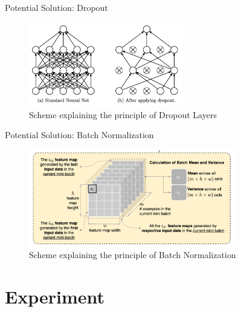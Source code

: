 \documentclass[aspectratio=169]{beamer}
\begin{document}
{    
    \begin{frame}{Potential Solution: Dropout}
        \begin{figure}
            \centering
            \includegraphics[width=0.6\textwidth]{img/dropout_schema.png}
            \caption{Scheme explaining the principle of Dropout Layers}
        \end{figure}
    \end{frame}


    \begin{frame}{Potential Solution: Batch Normalization}
        \begin{figure}
            \centering
            \includegraphics[width=0.8\textwidth]{img/BatchNorm_Schema.png}
            \caption{Scheme explaining the principle of Batch Normalization}
        \end{figure}
    \end{frame}

\section{Experiment} 

}
\end{document}
